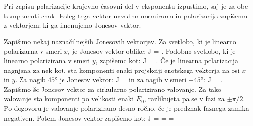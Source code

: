 Pri zapisu polarizacije krajevno-časovni del v eksponentu izpustimo, saj 
je za obe komponenti enak. Poleg tega vektor navadno normiramo in 
polarizacijo zapišemo z vektorjem:
ki ga imenujemo Jonesov vektor. 

Zapišimo nekaj naznačilnejših Jonesovih vektorjev. Za svetlobo, ki 
je linearno polarizarna v smeri $x$, je Jonesov vektor oblike:
\beq
J = \left[\begin{array}{c}
1\\
0\\
\end{array}\right]\!\!.
\label{eq:03_42}
\eeq
Podobno svetlobo, ki je linearno polarizirana v smeri $y$, zapišemo kot:
\beq
J = \left[\begin{array}{c}
0\\
1\\
\end{array}\right]\!\!.
\label{eq:03_43}
\eeq
Če je linearna polarizacija nagnjena za nek kot, sta komponenti enaki projekciji
enotskega vektorja na osi $x$ in $y$. Za nagib $45\si{\degree}$ je
Jonesov vektor:
\beq
J = \left[\begin{array}{c}
1\\
1\\
\end{array}\right]
\label{eq:03_44}
\eeq
in za nagib v smeri $-45\si{\degree}$:
\beq
J = \left[\begin{array}{c}
1\\
-1\\
\end{array}\right]\!\!.
\label{eq:03_45}
\eeq
Zapišimo še Jonesov vektor za cirkularno polarizirano
valovanje. Za tako valovanje sta komponenti po velikosti enaki $E_0$, 
razlikujeta pa se v fazi za $\pm \pi/2$. 
Po dogovoru je valovanje polarizirano desno ročno, če je predznak 
faznega zamika negativen. Potem Jonesov vektor zapišemo kot:
\beq
J = 
 = 
\left[\begin{array}{c}
1\\
e^{-i \pi/2}\\
\end{array}\right] =
